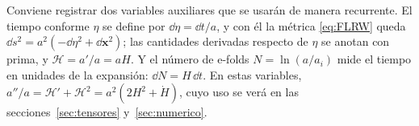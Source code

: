 Conviene registrar dos variables auxiliares que se usarán de manera recurrente. El tiempo conforme $\eta$ se define por $\dd\eta=\dd t/a$, y con él la métrica \eqref{eq:FLRW} queda $\dd s^2=a^2(-\dd\eta^2+\dd\mathbf x^2)$; las cantidades derivadas respecto de $\eta$ se anotan con prima, y $\mathcal H=a'/a=aH$. Y el número de e-folds $N=\ln(a/a_i)$ mide el tiempo en unidades de la expansión: $\dd N=H\,\dd t$. En estas variables, $a''/a=\mathcal H'+\mathcal H^2=a^2(2H^2+\dot H)$, cuyo uso se verá en las secciones~\ref{sec:tensores} y~\ref{sec:numerico}.
